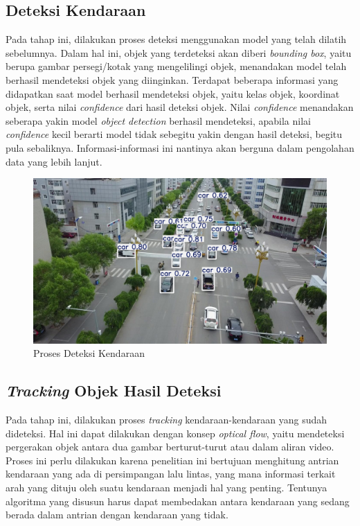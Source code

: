 \subsection{Deteksi Kendaraan}
Pada tahap ini, dilakukan proses deteksi menggunakan model yang telah dilatih sebelumnya. Dalam hal ini, objek yang terdeteksi akan diberi \emph{bounding box}, yaitu berupa gambar persegi/kotak yang mengelilingi objek, menandakan model telah berhasil mendeteksi objek yang diinginkan. Terdapat beberapa informasi yang didapatkan saat model berhasil mendeteksi objek, yaitu kelas objek, koordinat objek, serta nilai \emph{confidence} dari hasil deteksi objek. Nilai \emph{confidence} menandakan seberapa yakin model \emph{object detection} berhasil mendeteksi, apabila nilai \emph{confidence} kecil berarti model tidak sebegitu yakin dengan hasil deteksi, begitu pula sebaliknya. Informasi-informasi ini nantinya akan berguna dalam pengolahan data yang lebih lanjut.
\begin{figure} [H] \centering
  \includegraphics[scale=0.3]{gambar/coco_1.jpg}
  \caption{Proses Deteksi Kendaraan}
  \label{fig:deteksi_kendaraan}
\end{figure}

\subsection{\emph{Tracking} Objek Hasil Deteksi}
Pada tahap ini, dilakukan proses \emph{tracking} kendaraan-kendaraan yang sudah dideteksi. Hal ini dapat dilakukan dengan konsep \emph{optical flow}, yaitu mendeteksi pergerakan objek antara dua gambar berturut-turut atau dalam aliran video. Proses ini perlu dilakukan karena penelitian ini bertujuan menghitung antrian kendaraan yang ada di persimpangan lalu lintas, yang mana informasi terkait arah yang dituju oleh suatu kendaraan menjadi hal yang penting. Tentunya algoritma yang disusun harus dapat membedakan antara kendaraan yang sedang berada dalam antrian dengan kendaraan yang tidak.

